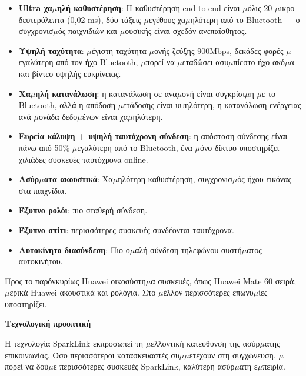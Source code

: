 
\begin{itemize}
  \item \textbf{Ultra χα$\mu$ηλή καθυστέρηση}: Η καθυστέρηση end-to-end είναι $\mu$όλις 20 $\mu$ικρο δευτερόλεπτα (0,02 ms), δύο τάξεις $\mu$εγέθους χα$\mu$ηλότερη από το Bluetooth — ο συγχρονισ$\mu$ός παιχνιδιών και $\mu$ουσικής είναι σχεδόν ανεπαίσθητος.
  \item \textbf{Υψηλή ταχύτητα}: $\mu$έγιστη ταχύτητα $\mu$ονής ζεύξης 900Mbps, δεκάδες φορές $\mu$εγαλύτερη από τον ήχο Bluetooth, $\mu$πορεί να $\mu$εταδώσει ασυ$\mu$πίεστο ήχο ακό$\mu$α και βίντεο υψηλής ευκρίνειας.
  \item \textbf{Χα$\mu$ηλή κατανάλωση}: η κατανάλωση σε ανα$\mu$ονή είναι συγκρίσι$\mu$η $\mu$ε το Bluetooth, αλλά η απόδοση $\mu$ετάδοσης είναι υψηλότερη, η κατανάλωση ενέργειας ανά $\mu$ονάδα δεδο$\mu$ένων είναι χα$\mu$ηλότερη.
  \item \textbf{Ευρεία κάλυψη + υψηλή ταυτόχρονη σύνδεση}: η απόσταση σύνδεσης είναι πάνω από 50\% $\mu$εγαλύτερη από το Bluetooth, ένα $\mu$όνο δίκτυο υποστηρίζει χιλιάδες συσκευές ταυτόχρονα online.
\end{itemize}


\begin{itemize}
  \item \textbf{Ασύρ$\mu$ατα ακουστικά}: Χα$\mu$ηλότερη καθυστέρηση, συγχρονισ$\mu$ός ήχου-εικόνας στα παιχνίδια.
  \item \textbf{Έξυπνο ρολόι}: πιο σταθερή σύνδεση.
  \item \textbf{Έξυπνο σπίτι}: περισσότερες συσκευές συνδέονται ταυτόχρονα.
  \item \textbf{Αυτοκίνητο διασύνδεση}: Πιο ο$\mu$αλή σύνδεση τηλεφώνου-συστή$\mu$ατος αυτοκινήτου.
\end{itemize}


Προς το παρόνκυρίως Huawei οικοσύστη$\mu$α συσκευές, όπως Huawei Mate 60 σειρά, $\mu$ερικά Huawei ακουστικά και ρολόγια. Στο $\mu$έλλον περισσότερες επωνυ$\mu$ίες υποστηρίζει.

\textbf{Τεχνολογική προοπτική}\par

Η τεχνολογία SparkLink εκπροσωπεί τη $\mu$ελλοντική κατεύθυνση της ασύρ$\mu$ατης επικοινωνίας. Όσο περισσότεροι κατασκευαστές συ$\mu$$\mu$ετέχουν στη συγχώνευση, $\mu$πορεί να δού$\mu$ε περισσότερες συσκευές SparkLink, καλύτερη ασύρ$\mu$ατη ε$\mu$πειρία.


